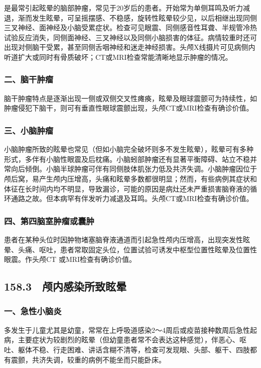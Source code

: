 是最常引起眩晕的脑部肿瘤，常见于20岁后的患者。开始常为单侧耳鸣及听力减退，渐而发生眩晕，可呈摇摆感、不稳感，旋转性眩晕较少见，以后相继出现同侧三叉神经、面神经及小脑受累症状。检查可见眼震、同侧感音性耳聋、半规管冷热试验反应消失，同侧面神经、三叉神经以及同侧小脑损害的体征。病情较重时还可出现对侧脑干受累，甚至同侧舌咽神经和迷走神经损害。头颅X线摄片可见病侧内听道扩大或同时有骨质破坏；CT或MRI检查常能清晰地显示肿瘤的情况。

\subsubsection{二、脑干肿瘤}

脑干肿瘤特点是逐渐出现一侧或双侧交叉性瘫痪，眩晕及眼球震颤可为持续性，如肿瘤侵犯下脑干，则可有垂直性眼球震颤出现，头颅CT或MRI检查有确诊价值。

\subsubsection{三、小脑肿瘤}

小脑肿瘤所致的眩晕也常见（但如小脑完全破坏则多不发生眩晕），眩晕可有多种形式，多伴有小脑性眼震及后枕痛。小脑蚓部肿瘤还有显著平衡障碍、站立不稳并常向后倾倒。小脑半球肿瘤可伴有同侧肢体肌张力低及共济失调。小脑肿瘤因位于颅后窝，易产生颅内压增高，头痛和眩晕多数都很明显；然而，有些病例其症状和体征在长时间内均不明显，导致漏诊，可能的原因是病灶还未严重损害脑脊液的循环通路之故。但本病罕有伴发听力减退及耳鸣。头颅CT或MRI检查有确诊价值。

\subsubsection{四、第四脑室肿瘤或囊肿}

患者在某种头位时因肿物堵塞脑脊液通道而引起急性颅内压增高，出现突发性眩晕、头痛、呕吐，患者常取固定头位，位置试验可诱发中枢型位置性眩晕及位置性眼震。作头颅CT
或MRI检查有确诊价值。

\subsection{158.3　颅内感染所致眩晕}

\subsubsection{一、急性小脑炎}

多发生于儿童尤其是幼童，常常在上呼吸道感染2～4周后或疫苗接种数周后急性起病，主要症状为较剧烈的眩晕（但幼童患者常不会表达这种感觉），伴恶心、呕吐、躯体不稳、行走困难、讲话含糊不清等，检查可发现眼、头部、躯干、四肢都有震颤，共济失调，较重的病例不能坐而只能卧床。

